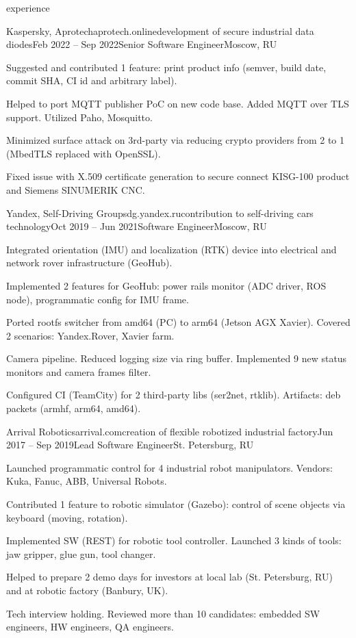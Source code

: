 \documentclass{Vladimir.Ivanov.CV}
\begin{document}
\begin{rSection}{experience}
\begin{rCompany}{Kaspersky, Aprotech}{aprotech.online}{development of secure industrial data diodes}{Feb 2022 -- Sep 2022}{Senior Software Engineer}{Moscow, RU}

\item Suggested and contributed 1 feature: print product info (semver, build date, commit SHA, CI id and arbitrary label).
\item Helped to port MQTT publisher PoC on new code base. Added MQTT over TLS support. Utilized Paho, Mosquitto.
\item Minimized surface attack on 3rd-party via reducing crypto providers from 2 to 1 (MbedTLS replaced with OpenSSL).
\item Fixed issue with X.509 certificate generation to secure connect KISG-100 product and Siemens SINUMERIK CNC.

\end{rCompany}
\begin{rCompany}{Yandex, Self-Driving Group}{sdg.yandex.ru}{contribution to self-driving cars technology}{Oct 2019 -- Jun 2021}{Software Engineer}{Moscow, RU}

\item Integrated orientation (IMU) and localization (RTK) device into electrical and network rover infrastructure (GeoHub).
\item Implemented 2 features for GeoHub: power rails monitor (ADC driver, ROS node), programmatic config for IMU frame.
\item Ported rootfs switcher from amd64 (PC) to arm64 (Jetson AGX Xavier). Covered 2 scenarios: Yandex.Rover, Xavier farm.
\item Camera pipeline. Reduced logging size via ring buffer. Implemented 9 new status monitors and camera frames filter.
\item Configured CI (TeamCity) for 2 third-party libs (ser2net, rtklib). Artifacts: deb packets (armhf, arm64, amd64).

\end{rCompany}
\begin{rCompany}{Arrival Robotics}{arrival.com}{creation of flexible robotized industrial factory}{Jun 2017 -- Sep 2019}{Lead Software Engineer}{St. Petersburg, RU}

\item Launched programmatic control for 4 industrial robot manipulators. Vendors: Kuka, Fanuc, ABB, Universal Robots.
\item Contributed 1 feature to robotic simulator (Gazebo): control of scene objects via keyboard (moving, rotation).
\item Implemented SW (REST) for robotic tool controller. Launched 3 kinds of tools: jaw gripper, glue gun, tool changer.
\item Helped to prepare 2 demo days for investors at local lab (St. Petersburg, RU) and at robotic factory (Banbury, UK).
\item Tech interview holding. Reviewed more than 10 candidates: embedded SW engineers, HW engineers, QA engineers.


\end{rCompany}
\end{rSection}
\end{document}
